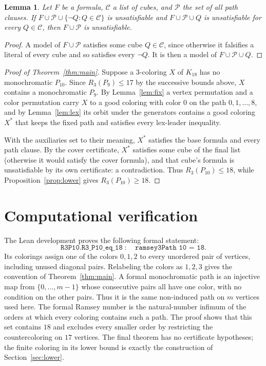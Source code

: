 \documentclass[11pt]{article}
\newtheorem{lemma}[theorem]{Lemma}
\theoremstyle{definition}
\theoremstyle{remark}
\newcommand{\R}{R_3}
\begin{document}
\begin{lemma}\label{lem:cover}
Let $F$ be a formula, $\mathcal C$ a list of cubes, and $\mathcal P$ the
set of all path clauses. If $F\cup\mathcal P\cup\{\neg Q: Q\in\mathcal C\}$
is unsatisfiable and $F\cup\mathcal P\cup Q$ is unsatisfiable for every
$Q\in\mathcal C$, then $F\cup\mathcal P$ is unsatisfiable.
\end{lemma}

\begin{proof}
A model of $F\cup\mathcal P$ satisfies some cube $Q\in\mathcal C$, since
otherwise it falsifies a literal of every cube and so satisfies every
$\neg Q$. It is then a model of $F\cup\mathcal P\cup Q$.
\end{proof}

\begin{proof}[Proof of Theorem~\ref{thm:main}]
Suppose a $3$-coloring $X$ of $K_{18}$ has no monochromatic $P_{10}$. Since
$\R(P_9)\le17$ by the successive bounds above, $X$ contains a
monochromatic $P_9$. By Lemma~\ref{lem:fix} a vertex permutation and a
color permutation carry $X$ to a good coloring with color $0$ on the path
$0,1,\dots,8$, and by Lemma~\ref{lem:lex} its orbit under the generators
contains a good coloring $X^*$ that keeps the fixed path and satisfies
every lex-leader inequality.

With the auxiliaries set to their meaning,
$X^*$ satisfies the base formula and every path clause. By the cover
certificate, $X^*$ satisfies some cube of the final list (otherwise it
would satisfy the cover formula), and that cube's formula is unsatisfiable
by its own certificate: a contradiction.
Thus $\R(P_{10})\le18$, while Proposition~\ref{prop:lower} gives
$\R(P_{10})\ge18$.
\end{proof}

\section{Computational verification}\label{sec:verification}
The Lean development proves the following formal statement:
\[
\texttt{R3P10.R3\_P10\_eq\_18}\;:\quad\texttt{ramsey3Path 10 = 18}.
\]
Its colorings assign one of the colors $0,1,2$ to every unordered pair of
vertices, including unused diagonal pairs. Relabeling the colors as
$1,2,3$ gives the convention of Theorem~\ref{thm:main}.
A formal monochromatic path is an injective map from $\{0,\dots,m-1\}$
whose consecutive pairs all have one color, with no condition on the
other pairs. Thus it is the same non-induced path on $m$ vertices used
here. The formal Ramsey number is the natural-number infimum of the
orders at which every coloring contains such a path. The proof shows
that this set contains $18$ and excludes every smaller order by
restricting the countercoloring on $17$ vertices. The final theorem has
no certificate hypotheses; the finite coloring in its lower bound is
exactly the construction of Section~\ref{sec:lower}.
\end{document}
